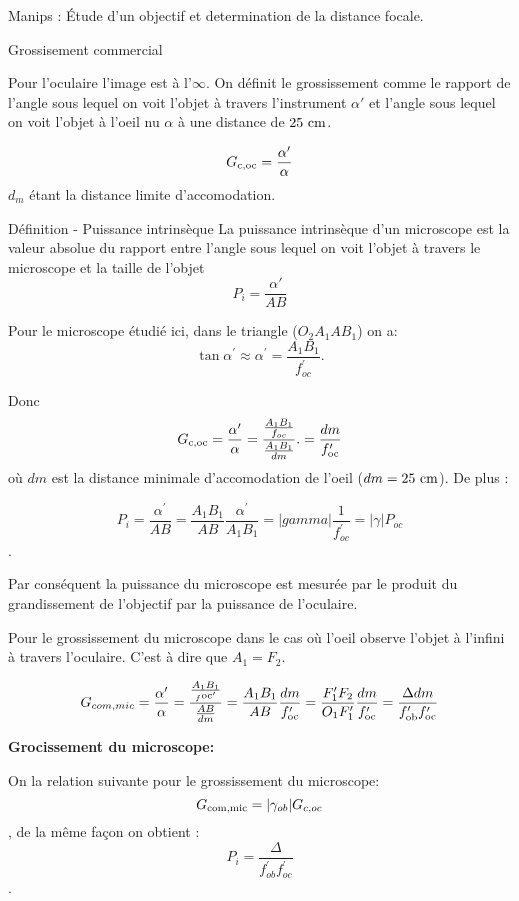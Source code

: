 \documentclass[french, a4paper, 10pt, twocolumn, landscape]{article}
\begin{document}
Manips : Étude d'un objectif et determination de la distance focale.


	\begin{definition}{Grossisement commercial}

		Pour l'oculaire l'image est à l'$\infty$. On définit le grossissement comme le rapport de l'angle sous lequel on voit l'objet à travers l'instrument $\alpha'$ et l'angle sous lequel on voit l'objet à l'oeil nu $\alpha$ à une distance de $25~\rm cm$. 

		$$G_{\rm c,oc} = \frac{\alpha'}{\alpha}$$
		$d_m$ étant la distance limite d'accomodation.
	\end{definition}


	\begin{definition}{Définition - Puissance intrinsèque}
		La puissance intrinsèque d’un microscope est la valeur absolue du rapport entre l’angle sous lequel on voit l’objet à travers le microscope et la taille de l’objet
		$$P_i = \frac{\alpha'}{AB}$$
	\end{definition}

Pour le microscope étudié ici, dans le triangle ($O_2A_1AB_1$) on a: $$\tan\alpha^\prime \approx \alpha^\prime = \frac{A_1B_1}{f_{oc}^\prime}.$$ 


Donc $$G_{\rm c,oc} = \frac{\alpha^\prime}{\alpha} = \frac{\frac{A_1B_1}{f_{oc}}}{\frac{A_1B_1}{dm}}. = \frac{dm}{f_{\rm oc}^\prime}$$
où $dm$ est la distance minimale d'accomodation de l'oeil ($dm=25~\rm cm$). De plus : 

$$P_i = \frac{\alpha^\prime}{AB} = \frac{A_1B_1}{AB}\frac{\alpha^\prime}{A_1B_1}= |gamma|\frac{1}{f_{oc}^\prime}=|\gamma|P_{oc}$$.

Par conséquent la puissance du microscope est mesurée par le produit du grandissement de l'objectif par la puissance de l'oculaire.

Pour le grossissement du microscope dans le cas où l'oeil observe l'objet à l'infini à travers l'oculaire. C'est à dire que $A_1=F_2$. 

$$G_{com,mic} = \frac{\alpha^\prime}{\alpha} = \frac{\frac{A_1B_1}{_f{\rm oc}^\prime}}{\frac{AB}{dm}} = \frac{A_1B_1}{AB}\frac{dm}{f_{\rm oc }^\prime} = \frac{F_1^\prime F_2}{O_1F_1^\prime}\frac{dm}{f_{\rm oc }^\prime} = \frac{\Delta dm}{f_{\rm ob}^\prime f_{\rm oc}^\prime}$$




		\textbf{Grocissement du microscope:}\medskip 

		On la relation suivante pour le grossissement du microscope: 
		$$G_{\rm com,mic} = |\gamma_{ob}|G_{c, oc}$$, de la même façon on obtient : $$P_i = \frac{\Delta}{f_{ob}^\prime f_{oc}^\prime }$$.
\end{document}

